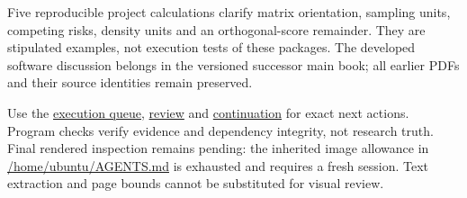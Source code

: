 \documentclass[
  10pt,
]{article}
\begin{document}
Five reproducible project calculations clarify matrix orientation,
sampling units, competing risks, density units and an orthogonal-score
remainder. They are stipulated examples, not execution tests of these
packages. The developed software discussion belongs in the versioned
successor main book; all earlier PDFs and their source identities remain
preserved.

Use the \href{gap-execution-v13_1/execution-queue.json}{execution
queue}, \href{gap-execution-v13_1/review.md}{review} and
\href{gap-execution-v13_1/continuation.md}{continuation} for exact next
actions. Program checks verify evidence and dependency integrity, not
research truth. Final rendered inspection remains pending: the inherited
image allowance in \url{/home/ubuntu/AGENTS.md} is exhausted and
requires a fresh session. Text extraction and page bounds cannot be
substituted for visual review.
\end{document}
